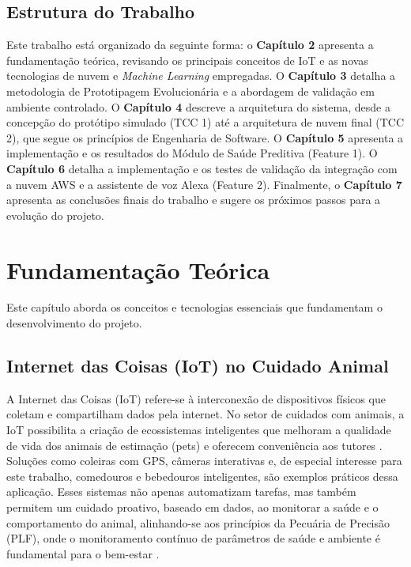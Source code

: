 \section{Estrutura do Trabalho}
Este trabalho está organizado da seguinte forma: o \textbf{Capítulo 2} apresenta a fundamentação teórica, revisando os principais conceitos de IoT e as novas tecnologias de nuvem e \textit{Machine Learning} empregadas.
O \textbf{Capítulo 3} detalha a metodologia de Prototipagem Evolucionária e a abordagem de validação em ambiente controlado.
O \textbf{Capítulo 4} descreve a arquitetura do sistema, desde a concepção do protótipo simulado (TCC 1) até a arquitetura de nuvem final (TCC 2), que segue os princípios de Engenharia de Software.
O \textbf{Capítulo 5} apresenta a implementação e os resultados do Módulo de Saúde Preditiva (Feature 1).
O \textbf{Capítulo 6} detalha a implementação e os testes de validação da integração com a nuvem AWS e a assistente de voz Alexa (Feature 2).
Finalmente, o \textbf{Capítulo 7} apresenta as conclusões finais do trabalho e sugere os próximos passos para a evolução do projeto.












\chapter{Fundamentação Teórica}
Este capítulo aborda os conceitos e tecnologias essenciais que fundamentam o desenvolvimento do projeto.
\section{Internet das Coisas (IoT) no Cuidado Animal}
A Internet das Coisas (IoT) refere-se à interconexão de dispositivos físicos que coletam e compartilham dados pela internet.
No setor de cuidados com animais, a IoT possibilita a criação de ecossistemas inteligentes que melhoram a qualidade de vida dos animais de estimação (pets) e oferecem conveniência aos tutores \cite{rodrigues2019, iotah_review2020}.
Soluções como coleiras com GPS, câmeras interativas e, de especial interesse para este trabalho, comedouros e bebedouros inteligentes, são exemplos práticos dessa aplicação.
Esses sistemas não apenas automatizam tarefas, mas também permitem um cuidado proativo, baseado em dados, ao monitorar a saúde e o comportamento do animal, alinhando-se aos princípios da Pecuária de Precisão (PLF), onde o monitoramento contínuo de parâmetros de saúde e ambiente é fundamental para o bem-estar \cite{jacomini2024, plf_overview2022, ilvo_plf}.
